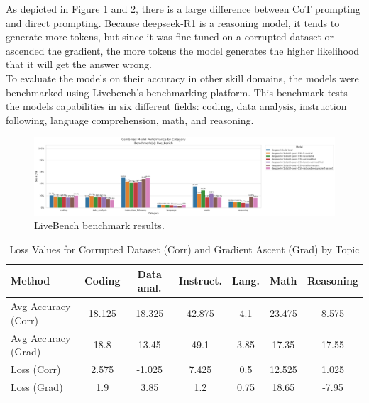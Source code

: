 \documentclass[10.5pt]{article}
\begin{document}
As depicted in Figure 1 and 2, there is a large difference between CoT prompting and direct prompting. Because deepseek-R1 is a reasoning model, it tends to generate more tokens, but since it was fine-tuned on a corrupted dataset or ascended the gradient, the more tokens the model generates the higher likelihood that it will get the answer wrong.
\\
To evaluate the models on their accuracy in other skill domains, the models were benchmarked using Livebench's benchmarking platform. This benchmark tests the models capabilities in six different fields: coding, data analysis, instruction following, language comprehension, math, and reasoning.
\begin{figure}[h]
    \centering
    \includegraphics[width=0.9\linewidth]{combined_group_scores_live_bench.png}
    \caption{LiveBench benchmark results.}
    \label{fig:bench_and_direct}
\end{figure}
\begin{table}[h]
\centering
\tiny
\caption{Loss Values for Corrupted Dataset (Corr) and Gradient Ascent (Grad) by Topic}
\label{tab:loss}
\setlength{\tabcolsep}{3.5pt}
\begin{tabular}{|l|c|c|c|c|c|c|}
\hline
\textbf{Method} & \textbf{Coding} & \textbf{Data anal.} & \textbf{Instruct.} & \textbf{Lang.} & \textbf{Math} & \textbf{Reasoning} \\ \hline
Avg Accuracy (Corr) & 18.125 & 18.325 & 42.875 & 4.1 & 23.475 & 8.575 \\ \hline
Avg Accuracy (Grad) & 18.8 & 13.45 & 49.1 & 3.85 & 17.35 & 17.55 \\ \hline
Loss (Corr) & 2.575 & -1.025 & 7.425 & 0.5 & 12.525 & 1.025  \\ \hline
Loss (Grad) & 1.9 & 3.85 & 1.2 & 0.75 & 18.65 & -7.95  \\ \hline
\end{tabular}
\end{table}
\end{document}
